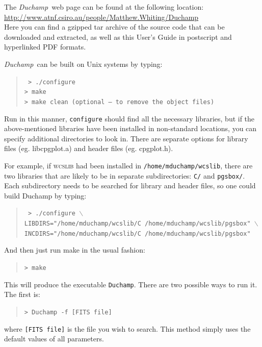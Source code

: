 \documentclass[12pt,a4paper]{article}
\newcommand{\duchamp}{\emph{Duchamp}}
\begin{document}
The \duchamp\ web page can be found at the following location:\\
\href{http://www.atnf.csiro.au/people/Matthew.Whiting/Duchamp}%
{http://www.atnf.csiro.au/people/Matthew.Whiting/Duchamp}\\
Here you can find a gzipped tar archive of the source code that can be
downloaded and extracted, as well as this User's Guide in postscript
and hyperlinked PDF formats.

\duchamp\ can be built on Unix systems by typing:
\begin{quote}
\texttt{%
> ./configure\\
> make\\
> make clean (optional -- to remove the object files)}
\end{quote}

Run in this manner, \texttt{configure} should find all the necessary
libraries, but if the above-mentioned libraries have been installed in
non-standard locations, you can specify additional directories to look
in. There are separate options for library files (eg. libcpgplot.a)
and header files (eg. cpgplot.h).

For example, if \textsc{wcslib} had been installed in
\texttt{/home/mduchamp/wcslib}, there are two libraries that are
likely to be in separate subdirectories: \texttt{C/} and
\texttt{pgsbox/}. Each subdirectory needs to be searched for library
and header files, so one could build Duchamp by typing: 
\begin{quote}
\texttt{%
>  ./configure $\backslash$ \\ 
LIBDIRS="/home/mduchamp/wcslib/C /home/mduchamp/wcslib/pgsbox" 
$\backslash$\\
INCDIRS="/home/mduchamp/wcslib/C /home/mduchamp/wcslib/pgsbox"}
\end{quote}
And then just run make in the usual fashion:
\begin{quote}
\texttt{> make}
\end{quote}

This will produce the executable \texttt{Duchamp}. There are two
possible ways to run it. The first is:
\begin{quote}
\texttt{> Duchamp -f [FITS file]}
\end{quote}
where \texttt{[FITS file]} is the file you wish to search. This method
simply uses the default values of all parameters.
\end{document}
